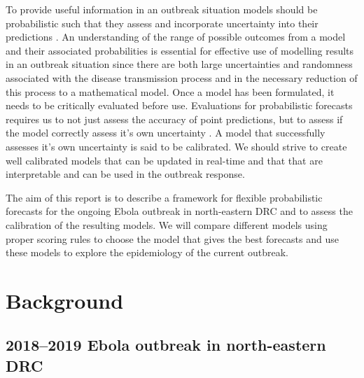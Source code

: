 \documentclass[12pt]{article}
\begin{document}
To provide useful information in an outbreak situation models should be probabilistic such that they assess and incorporate uncertainty into their predictions \cite{funkAssessingPerformanceRealtime2019, weiCalibrationTestsCount2014,gneitingEditorialProbabilisticForecasting2008}. An understanding of the range of possible outcomes from a model and their associated probabilities is essential for effective use of modelling results in an outbreak situation since there are both large uncertainties and randomness associated with the disease transmission process and in the necessary reduction of this process to a mathematical model. Once a model has been formulated, it needs to be critically evaluated before use. Evaluations for probabilistic forecasts requires us to not just assess the accuracy of point predictions, but to assess if the model correctly assess it's own uncertainty \cite{gneitingProbabilisticForecastsCalibration2007, czadoPredictiveModelAssessment2009}. A model that successfully assesses it's own uncertainty is said to be calibrated. We should strive to create well calibrated models that can be updated in real-time and that that are interpretable and can be used in the outbreak response. 

The aim of this report is to describe a framework for flexible probabilistic forecasts for the ongoing Ebola outbreak in north-eastern DRC and to assess the calibration of the resulting models. We will compare different models using proper scoring rules to choose the model that gives the best forecasts and use these models to explore the epidemiology of the current outbreak. 

\section{Background}
\subsection{2018--2019 Ebola outbreak in north-eastern DRC}
\end{document}
